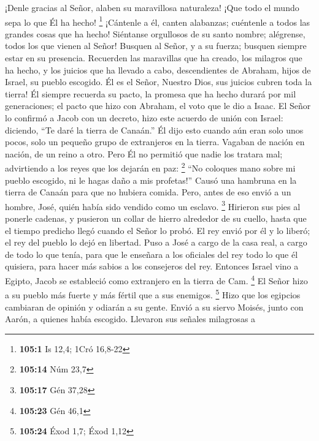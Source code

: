  ¡Denle gracias al Señor, alaben su maravillosa naturaleza!
¡Que todo el mundo sepa lo que Él ha hecho! \footnote{\textbf{105:1} Is
  12,4; 1Cró 16,8-22}  ¡Cántenle a él, canten alabanzas;
cuéntenle a todos las grandes cosas que ha hecho!  Siéntanse
orgullosos de su santo nombre; alégrense, todos los que vienen al Señor!
 Busquen al Señor, y a su fuerza; busquen siempre estar en
su presencia.  Recuerden las maravillas que ha creado, los
milagros que ha hecho, y los juicios que ha llevado a cabo, 
descendientes de Abraham, hijos de Israel, su pueblo escogido.
 Él es el Señor, Nuestro Dios, sus juicios cubren toda la
tierra!  Él siempre recuerda su pacto, la promesa que ha
hecho durará por mil generaciones;  el pacto que hizo con
Abraham, el voto que le dio a Isaac.  El Señor lo confirmó
a Jacob con un decreto, hizo este acuerdo de unión con Israel:
 diciendo, ``Te daré la tierra de Canaán.'' 
Él dijo esto cuando aún eran solo unos pocos, solo un pequeño grupo de
extranjeros en la tierra.  Vagaban de nación en nación, de
un reino a otro.  Pero Él no permitió que nadie los tratara
mal; advirtiendo a los reyes que los dejarán en paz: \footnote{\textbf{105:14}
  Núm 23,7}  ``No coloques mano sobre mi pueblo escogido,
ni le hagas daño a mis profetas!''  Causó una hambruna en
la tierra de Canaán para que no hubiera comida.  Pero,
antes de eso envió a un hombre, José, quién había sido vendido como un
esclavo. \footnote{\textbf{105:17} Gén 37,28}  Hirieron sus
pies al ponerle cadenas, y pusieron un collar de hierro alrededor de su
cuello,  hasta que el tiempo predicho llegó cuando el Señor
lo probó.  El rey envió por él y lo liberó; el rey del
pueblo lo dejó en libertad.  Puso a José a cargo de la casa
real, a cargo de todo lo que tenía,  para que le enseñara a
los oficiales del rey todo lo que él quisiera, para hacer más sabios a
los consejeros del rey.  Entonces Israel vino a Egipto,
Jacob se estableció como extranjero en la tierra de Cam. \footnote{\textbf{105:23}
  Gén 46,1}  El Señor hizo a su pueblo más fuerte y más
fértil que a sus enemigos. \footnote{\textbf{105:24} Éxod 1,7; Éxod 1,12}
 Hizo que los egipcios cambiaran de opinión y odiarán a su
gente.  Envió a su siervo Moisés, junto con Aarón, a
quienes había escogido.  Llevaron sus señales milagrosas a
